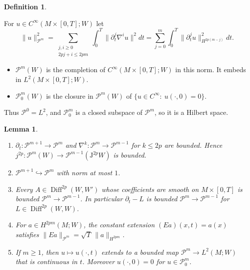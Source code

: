 \documentclass[11pt,reqno]{amsart}
\newtheorem{lemma}[theorem]{Lemma}
\theoremstyle{definition}
\newtheorem{definition}[theorem]{Definition}
\theoremstyle{remark}
\newcommand{\Pp}{\mathcal{P}}
\newcommand{\Jet}{\mathrm{J}}
\newcommand{\Diff}{\operatorname{Diff}}
\newcommand{\norm}[1]{\lVert #1\rVert}
\newcommand{\lean}[1]{}
\newcommand{\uses}[1]{}
\numberwithin{equation}{section}
\begin{document}
\begin{definition}\label{def:parabolic}
\lean{ShortTime.ParabolicSpace, ShortTime.ParabolicSpace.zeroAtStart}
\uses{def:sobolev}
For $u\in C^\infty(M\times[0,T];W)$ let
\[
  \norm{u}_{\Pp^m}^2=\sum_{\substack{j,i\ge0\\2pj+i\le2pm}}\int_0^T\norm{\partial_t^j\nabla^iu}^2dt
  =\sum_{j=0}^m\int_0^T\norm{\partial_t^ju}_{H^{2p(m-j)}}^2dt .
\]
\begin{itemize}[nosep]
\item $\Pp^m(W)$ is the completion of $C^\infty(M\times[0,T];W)$ in this norm. It embeds in
  $L^2(M\times[0,T];W)$.
\item $\Pp^m_0(W)$ is the closure in $\Pp^m(W)$ of $\{u\in C^\infty:\ u(\cdot,0)=0\}$.
\end{itemize}
Thus $\Pp^0=L^2$, and $\Pp^m_0$ is a closed subspace of $\Pp^m$, so it is a Hilbert space.
\end{definition}

\begin{lemma}\label{lem:parabolic-basic}
\lean{ShortTime.ParabolicSpace.timeDeriv, ShortTime.ParabolicSpace.jet, ShortTime.ParabolicSpace.constExt, ShortTime.ParabolicSpace.evalJet, ShortTime.ParabolicSpace.evalJet_ofSmooth, ShortTime.ParabolicSpace.continuousOn_evalJet_bundle, ShortTime.ParabolicSpace.evalJet_eq_zero_of_mem_zeroAtStart, ShortTime.ParabolicSpace.eq_zero_of_ofSmooth_eq_zero, ShortTime.ParabolicSpace.levelIncl, ShortTime.ParabolicSpace.evalJet_levelIncl, ShortTime.sobolevNormSq_le_integral, ShortTime.sobolevNormSq_timeDerivIter_le_parabolicInner, ShortTime.parabolicInner_iteratedCovGrad_le, ShortTime.parabolicInner_timeDeriv_le}
\uses{def:parabolic, lem:sobolev-basic}
\begin{enumerate}[label=(\roman*),nosep]
\item $\partial_t\colon\Pp^{m+1}\to\Pp^m$ and $\nabla^k\colon\Pp^m\to\Pp^{m-1}$ for $k\le2p$ are
  bounded. Hence $j^{2p}\colon\Pp^m(W)\to\Pp^{m-1}(\Jet^{2p}W)$ is bounded.
\item $\Pp^{m+1}\hookrightarrow\Pp^m$ with norm at most $1$.
\item Every $A\in\Diff^{2p}(W,W')$ whose coefficients are smooth on $M\times[0,T]$ is bounded
  $\Pp^m\to\Pp^{m-1}$. In particular $\partial_t-L$ is bounded $\Pp^m\to\Pp^{m-1}$ for
  $L\in\Diff^{2p}(W,W)$.
\item For $a\in H^{2pm}(M;W)$, the constant extension $(Ea)(x,t)=a(x)$ satisfies
  $\norm{Ea}_{\Pp^m}=\sqrt T\,\norm a_{H^{2pm}}$.
\item If $m\ge1$, then $u\mapsto u(\cdot,t)$ extends to a bounded map $\Pp^m\to L^2(M;W)$ that is
  continuous in $t$. Moreover $u(\cdot,0)=0$ for $u\in\Pp^m_0$.
\end{enumerate}
\end{lemma}
\end{document}
